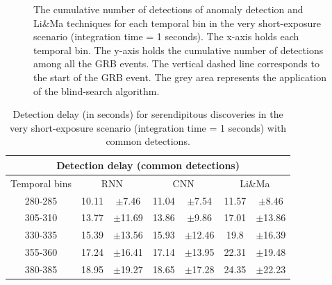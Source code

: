 \begin{figure}[!ht]
\centering

\captionsetup{width=0.9\linewidth}
\caption{The cumulative number of detections of anomaly detection and Li\&Ma techniques for each temporal bin in the very short-exposure scenario (integration time = 1 seconds). The x-axis holds each temporal bin. The y-axis holds the cumulative number of detections among all the GRB events. The vertical dashed line corresponds to the start of the GRB event. The grey area represents the application of the blind-search algorithm.}
\label{f:serendipitous-discoveries-itime-1}
\end{figure}

 
\begin{table}[!ht]
\centering
\begin{tabular}{|c|cc|cc|cc|} 
\hline
\multicolumn{7}{|c|}{\textbf{Detection delay} (common detections)} \\ 
\hline
\multicolumn{1}{|c|}{Temporal bins} & \multicolumn{2}{c|}{RNN} & \multicolumn{2}{c|}{CNN} & \multicolumn{2}{c|}{Li\&Ma} \\ 
\hline
280-285 & 10.11 &  $\pm$7.46 & 11.04 &  $\pm$7.54  & 11.57 &  $\pm$8.46\\
305-310 & 13.77 & $\pm$11.69 & 13.86 &  $\pm$9.86 & 17.01 & $\pm$13.86\\
330-335 & 15.39 & $\pm$13.56 & 15.93 & $\pm$12.46 & 19.8 & $\pm$16.39 \\
355-360 & 17.24 & $\pm$16.41 & 17.14 & $\pm$13.95 & 22.31 & $\pm$19.48 \\
380-385 & 18.95 & $\pm$19.27 & 18.65 & $\pm$17.28 & 24.35 &$\pm$22.23 \\
\hline
\end{tabular}
\caption{Detection delay (in seconds) for serendipitous discoveries in the very short-exposure scenario (integration time = 1 seconds) with common detections.}
\label{tab:dd-itime-1-common}
\end{table}




\FloatBarrier
